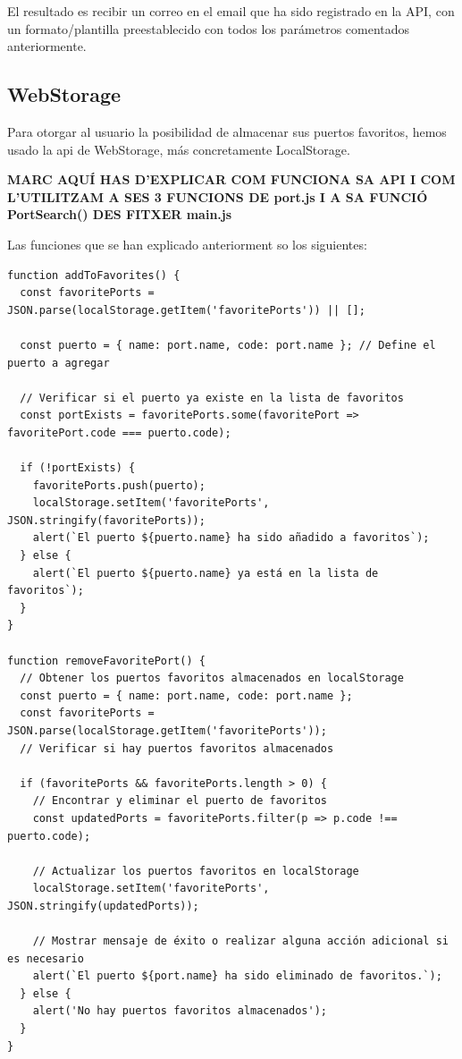 \documentclass{article}
\begin{document}
    El resultado es recibir un correo en el email que ha sido registrado en la API, con un formato/plantilla preestablecido con todos los parámetros comentados anteriormente.

\subsection{WebStorage}
Para otorgar al usuario la posibilidad de almacenar sus puertos favoritos, hemos usado la api de WebStorage, más concretamente LocalStorage.


\textbf{MARC AQUÍ HAS D'EXPLICAR COM FUNCIONA SA API I COM L'UTILITZAM A SES 3 FUNCIONS DE port.js I A SA FUNCIÓ PortSearch() DES FITXER main.js}


Las funciones que se han explicado anteriorment so los siguientes:
\begin{verbatim}
function addToFavorites() {
  const favoritePorts = JSON.parse(localStorage.getItem('favoritePorts')) || [];

  const puerto = { name: port.name, code: port.name }; // Define el puerto a agregar

  // Verificar si el puerto ya existe en la lista de favoritos
  const portExists = favoritePorts.some(favoritePort => favoritePort.code === puerto.code);

  if (!portExists) {
    favoritePorts.push(puerto);
    localStorage.setItem('favoritePorts', JSON.stringify(favoritePorts));
    alert(`El puerto ${puerto.name} ha sido añadido a favoritos`);
  } else {
    alert(`El puerto ${puerto.name} ya está en la lista de favoritos`);
  }
}

function removeFavoritePort() {
  // Obtener los puertos favoritos almacenados en localStorage
  const puerto = { name: port.name, code: port.name };
  const favoritePorts = JSON.parse(localStorage.getItem('favoritePorts'));
  // Verificar si hay puertos favoritos almacenados
  
  if (favoritePorts && favoritePorts.length > 0) {
    // Encontrar y eliminar el puerto de favoritos
    const updatedPorts = favoritePorts.filter(p => p.code !== puerto.code);

    // Actualizar los puertos favoritos en localStorage
    localStorage.setItem('favoritePorts', JSON.stringify(updatedPorts));

    // Mostrar mensaje de éxito o realizar alguna acción adicional si es necesario
    alert(`El puerto ${port.name} ha sido eliminado de favoritos.`);
  } else {
    alert('No hay puertos favoritos almacenados');
  }
}
\end{verbatim}
\end{document}
